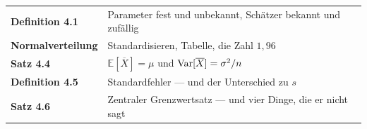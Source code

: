 \begin{merksatz}
\begin{center}
\renewcommand{\arraystretch}{1.5}
\begin{tabular}{@{}P{3.2cm}P{5.4cm}@{}}
\toprule
\textbf{Definition 4.1} & Parameter fest und unbekannt, Schätzer bekannt und zufällig\\
\textbf{Normal\-verteilung} & Standardisieren, Tabelle, die Zahl $1{,}96$\\
\textbf{Satz 4.4} & $\mathbb{E}[\overline X] = \mu$ und $\operatorname{Var}[\overline X] = \sigma^2/n$\\
\textbf{Definition 4.5} & Standardfehler --- und der Unterschied zu $s$\\
\textbf{Satz 4.6} & Zentraler Grenzwertsatz --- und vier Dinge, die er nicht sagt\\
\bottomrule
\end{tabular}
\end{center}

\begin{center}
\begin{minipage}{0.88\textwidth}
\end{minipage}
\end{center}
\end{merksatz}
